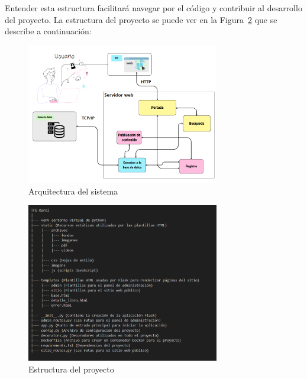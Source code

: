 \documentclass[a4paper, 12pt]{book}
\begin{document}
Entender esta estructura facilitará navegar por el código y contribuir al desarrollo del proyecto. La estructura del proyecto se puede ver en la Figura~\ref{fig:estructura} que se describe a continuación:

\begin{figure}
  \centering
  \includegraphics[width=0.75\textwidth]{img/esquema2.png}
  \caption{Arquitectura del sistema}
  \label{fig:arq}
\end{figure}
\begin{figure}
  \centering
  \includegraphics[width=0.75\textwidth]{img/estructura.png}
  \caption{Estructura del proyecto}
  \label{fig:estructura}
\end{figure}
\end{document}
